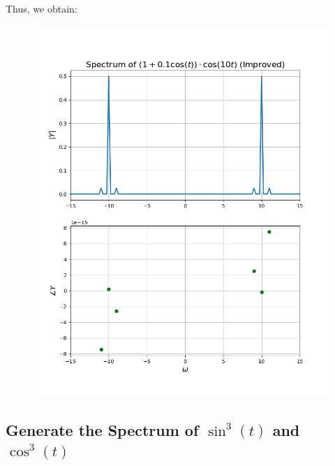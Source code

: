 \documentclass[12pt, a4paper]{article}
\begin{document}
Thus, we obtain:
\begin{figure}[H]
    \centering
    \includegraphics[scale=0.6]{eg4.png}
\end{figure}


\subsection{Generate the Spectrum of $\sin^3(t)$ and $\cos^3(t)$}
\end{document}
